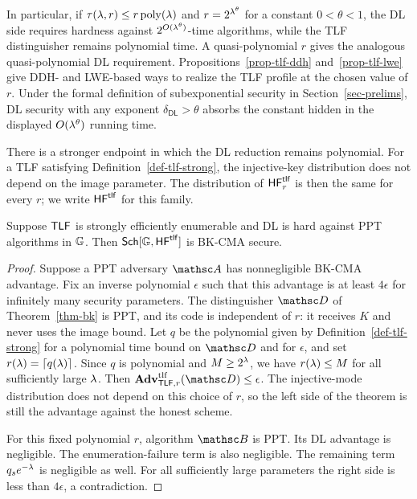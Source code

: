 In particular, if $\tau(\lambda,r)\le r\mathop{\rm poly}\nolimits(\lambda)$ and
$r=2^{\lambda^\theta}$ for a constant $0<\theta<1$, the DL side requires hardness
against $2^{O(\lambda^\theta)}$-time algorithms, while the TLF distinguisher
remains polynomial time. A quasi-polynomial $r$ gives the analogous
quasi-polynomial DL requirement. Propositions~\ref{prop-tlf-ddh}
and~\ref{prop-tlf-lwe} give DDH- and LWE-based ways to realize the TLF profile
at the chosen value of $r$. Under the formal definition of subexponential
security in Section~\ref{sec-prelims}, DL security with any exponent
$\delta_{\mathsf{DL}}>\theta$ absorbs the constant hidden in the displayed
$O(\lambda^\theta)$ running time.

There is a stronger endpoint in which the DL reduction remains polynomial.
For a TLF satisfying Definition~\ref{def-tlf-strong}, the injective-key
distribution does not depend on the image parameter. The distribution of
$\mathsf{HF}^{\mathsf{tlf}}_r$ is then the same for every $r$; we write
$\mathsf{HF}^{\mathsf{tlf}}$ for this family.

\begin{corollary} \label{cor-bk}
Suppose $\mathsf{TLF}$ is strongly efficiently enumerable and DL is hard against
PPT algorithms in $\mathbb{G}$. Then $\mathsf{Sch}[\mathbb{G},\mathsf{HF}^{\mathsf{tlf}}]$ is BK-CMA secure.
\end{corollary}

\begin{proof}
Suppose a PPT adversary $\advA$ has nonnegligible BK-CMA advantage. Fix an
inverse polynomial $\epsilon$ such that this advantage is at least $4\epsilon$
for infinitely many security parameters. The distinguisher $\advD$ of
Theorem~\ref{thm-bk} is PPT, and its code is independent of $r$: it receives $K$ and never uses the image
bound. Let $q$ be the polynomial given by
Definition~\ref{def-tlf-strong} for a polynomial time bound on $\advD$ and for
$\epsilon$, and set
$r(\lambda)=\lceil q(\lambda)\rceil$. Since $q$ is polynomial and
$M\ge2^\lambda$, we have $r(\lambda)\le M$ for all sufficiently large $\lambda$.
Then
$\AdvTLF{\TLF,r}{\advD}\le\epsilon$. The injective-mode distribution does not
depend on this choice of $r$, so the left side of the theorem is still the
advantage against the honest scheme.

For this fixed polynomial $r$, algorithm $\advB$ is PPT. Its DL advantage is
negligible. The enumeration-failure term is also negligible.
The remaining term $q_se^{-\lambda}$ is negligible as well. For all sufficiently
large parameters the right side is less than $4\epsilon$, a contradiction.
\end{proof}

